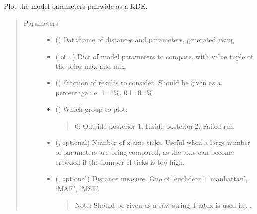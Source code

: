 \documentclass[letterpaper,10pt,english]{sphinxmanual}
\begin{document}
\begin{fulllineitems}
\label{\detokenize{misc:bayescmd.results_handling.kde_plot}}
Plot the model parameters pairwide as a KDE.
\begin{quote}\begin{description}
\item[{Parameters}] \leavevmode\begin{itemize}
\item {} 
 () \textendash{} Dataframe of distances and parameters, generated using
{\hyperref[\detokenize{misc:bayescmd.results_handling.data_import}]{}}

\item {} 
 ( of : ) \textendash{} Dict of model parameters to compare, with value tuple of the prior max
and min.

\item {} 
 () \textendash{} Fraction of results to consider. Should be given as a percentage i.e.
1=1\%, 0.1=0.1\%

\item {} 
 () \textendash{} 
Which group to plot:
\begin{quote}

0: Outside posterior
1: Inside posterior
2: Failed run
\end{quote}


\item {} 
 (, optional) \textendash{} Number of x-axis ticks. Useful when a large number of parameters are
bring compared, as the axes can become crowded if the number of ticks
is too high.

\item {} 
 (, optional) \textendash{} 
Distance measure. One of ‘euclidean’, ‘manhattan’, ‘MAE’, ‘MSE’.
\begin{quote}

Note: Should be given  as a raw string if latex is used i.e.
.
\end{quote}



\end{itemize}
\end{description}
\end{quote}
\end{fulllineitems}
\end{document}
